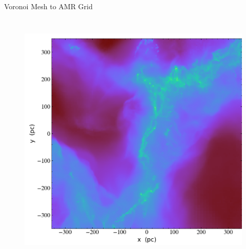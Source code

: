 \documentclass[aspectratio=169]{beamer}
\begin{document}
\begin{frame}{Voronoi Mesh to AMR Grid}
\begin{columns}
\begin{column}{0.44\textwidth}
\begin{figure}[h!]
                \label{fig:amr_example}
            \end{figure}
        \end{column}
    \end{columns}
\end{frame} 
%
%
%
%
\begin{frame}
    \centering
    \begin{figure}[h!]
        \includegraphics[width=0.5\linewidth]{../images/VorAMR_hdf5_chk_0001_Projection_z_dens.png}
    \end{figure}
\end{frame}
%
%
%
%
\end{document}
